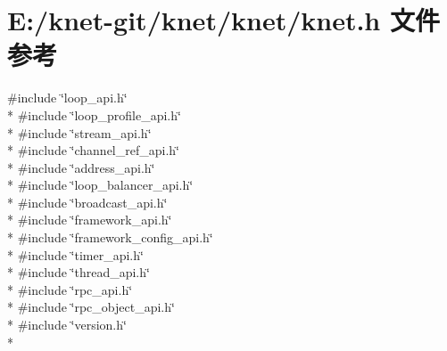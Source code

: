 \hypertarget{a00064}{}\section{E\+:/knet-\/git/knet/knet/knet.h 文件参考}
\label{a00064}
{\ttfamily \#include \char`\"{}loop\+\_\+api.\+h\char`\"{}}\\*
{\ttfamily \#include \char`\"{}loop\+\_\+profile\+\_\+api.\+h\char`\"{}}\\*
{\ttfamily \#include \char`\"{}stream\+\_\+api.\+h\char`\"{}}\\*
{\ttfamily \#include \char`\"{}channel\+\_\+ref\+\_\+api.\+h\char`\"{}}\\*
{\ttfamily \#include \char`\"{}address\+\_\+api.\+h\char`\"{}}\\*
{\ttfamily \#include \char`\"{}loop\+\_\+balancer\+\_\+api.\+h\char`\"{}}\\*
{\ttfamily \#include \char`\"{}broadcast\+\_\+api.\+h\char`\"{}}\\*
{\ttfamily \#include \char`\"{}framework\+\_\+api.\+h\char`\"{}}\\*
{\ttfamily \#include \char`\"{}framework\+\_\+config\+\_\+api.\+h\char`\"{}}\\*
{\ttfamily \#include \char`\"{}timer\+\_\+api.\+h\char`\"{}}\\*
{\ttfamily \#include \char`\"{}thread\+\_\+api.\+h\char`\"{}}\\*
{\ttfamily \#include \char`\"{}rpc\+\_\+api.\+h\char`\"{}}\\*
{\ttfamily \#include \char`\"{}rpc\+\_\+object\+\_\+api.\+h\char`\"{}}\\*
{\ttfamily \#include \char`\"{}version.\+h\char`\"{}}\\*
